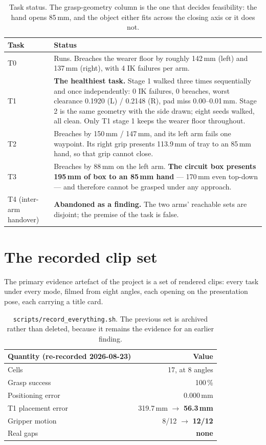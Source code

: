\documentclass[11pt,a4paper,oneside]{report}
\newcommand{\file}[1]{\texttt{\small #1}}
\begin{document}
\begin{table}[H]
\centering
\small
\begin{tabularx}{\textwidth}{@{}lX@{}}
\toprule
\textbf{Task} & \textbf{Status} \\
\midrule
T0 & Runs. Breaches the wearer floor by roughly 142\,mm (left) and 137\,mm
(right), with 4 IK failures per arm. \\
T1 & \textbf{The healthiest task.} Stage 1 walked three times sequentially and
once independently: 0 IK failures, 0 breaches, worst clearance 0.1920 (L) /
0.2148 (R), pad miss 0.00--0.01\,mm. Stage 2 is the same geometry with the side
drawn; eight seeds walked, all clean. Only T1 stage 1 keeps the wearer floor
throughout. \\
T2 & Breaches by 150\,mm / 147\,mm, and its left arm fails one waypoint. Its
right grip presents 113.9\,mm of tray to an 85\,mm hand, so that grip cannot
close. \\
T3 & Breaches by 88\,mm on the left arm. \textbf{The circuit box presents
195\,mm of box to an 85\,mm hand} --- 170\,mm even top-down --- and therefore
cannot be grasped under any approach. \\
T4 (inter-arm handover) & \textbf{Abandoned as a finding.} The two arms'
reachable sets are disjoint; the premise of the task is false. \\
\bottomrule
\end{tabularx}
\caption{Task status. The grasp-geometry column is the one that decides
feasibility: the hand opens 85\,mm, and the object either fits across the
closing axis or it does not.}
\end{table}

\section{The recorded clip set}

The primary evidence artefact of the project is a set of rendered clips: every
task under every mode, filmed from eight angles, each opening on the
presentation pose, each carrying a title card.

\begin{table}[H]
\centering
\small
\begin{tabular}{@{}lr@{}}
\toprule
\textbf{Quantity (re-recorded 2026-08-23)} & \textbf{Value} \\
\midrule
Cells & 17, at 8 angles \\
Grasp success & 100\,\% \\
Positioning error & 0.000\,mm \\
T1 placement error & 319.7\,mm $\rightarrow$ \textbf{56.3\,mm} \\
Gripper motion & 8/12 $\rightarrow$ \textbf{12/12} \\
Real gaps & \textbf{none} \\
\bottomrule
\end{tabular}
\caption{\file{scripts/record\_everything.sh}. The previous set is archived
rather than deleted, because it remains the evidence for an earlier finding.}
\end{table}
\end{document}
